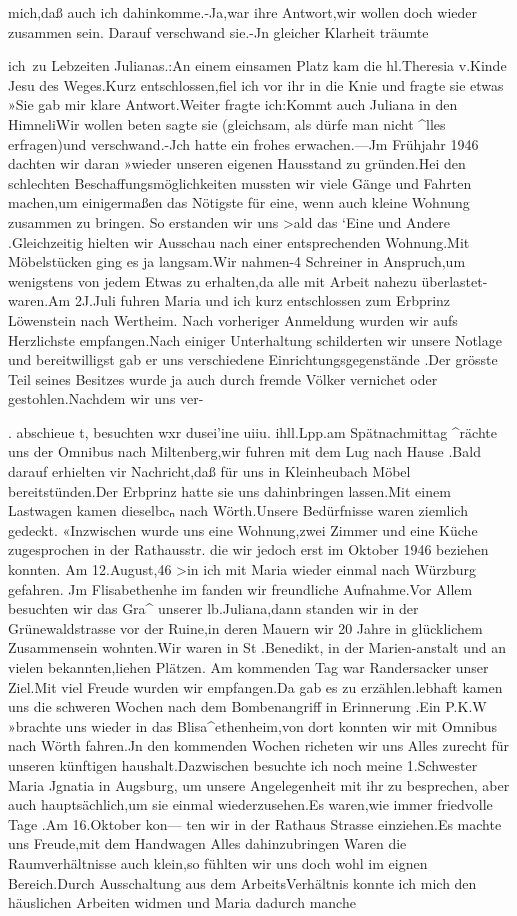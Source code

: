 \documentclass[a4paper,11pt]{article}
\begin{document}
mich,daß auch ich dahinkomme.-Ja,war ihre Antwort,wir wollen doch wieder zusammen sein. Darauf verschwand sie.-Jn gleicher Klarheit träumte

ich~zu Lebzeiten Julianas.:An einem einsamen Platz kam die hl.Theresia v.Kinde Jesu des Weges.Kurz entschlossen,fiel ich vor ihr in die Knie und fragte sie etwas »Sie gab mir klare Antwort.Weiter fragte ich:Kommt auch Juliana in den HimneliWir wollen beten sagte sie (gleichsam, als dürfe man nicht ^lles erfragen)und verschwand.-Jch hatte ein frohes erwachen.—Jm Frühjahr 1946 dachten wir daran »wieder unseren eigenen Hausstand zu gründen.Hei den schlechten Beschaffungsmöglichkeiten mussten wir viele Gänge und Fahrten machen,um einigermaßen das Nötigste für eine, wenn auch kleine Wohnung zusammen zu bringen. So erstanden wir uns >ald das ‘Eine und Andere .Gleichzeitig hielten wir Ausschau nach einer entsprechenden Wohnung.Mit Möbelstücken ging es ja langsam.Wir nahmen-4 Schreiner in Anspruch,um wenigstens von jedem Etwas zu erhalten,da alle mit Arbeit nahezu überlastet- waren.Am 2J.Juli fuhren Maria und ich kurz entschlossen zum Erbprinz Löwenstein nach Wertheim. Nach vorheriger Anmeldung wurden wir aufs Herzlichste empfangen.Nach einiger Unterhaltung schilderten wir unsere Notlage und bereitwilligst gab er uns verschiedene Einrichtungsgegenstände .Der grösste Teil seines Besitzes wurde ja auch durch fremde Völker vernichet oder gestohlen.Nachdem wir uns ver-

. abschieue t, besuchten wxr dusei'ine uiiu. ihll.Lpp.am Spätnachmittag ^rächte uns der Omnibus nach Miltenberg,wir fuhren mit dem Lug nach Hause .Bald darauf erhielten vir Nachricht,daß für uns in Kleinheubach Möbel bereitstünden.Der Erbprinz hatte sie uns dahinbringen lassen.Mit einem Lastwagen kamen dieselbcₙ nach Wörth.Unsere Bedürfnisse waren ziemlich gedeckt. «Inzwischen wurde uns eine Wohnung,zwei Zimmer und eine Küche zugesprochen in der Rathausstr. die wir jedoch erst im Oktober 1946 beziehen konnten. Am 12.August,46 >in ich mit Maria wieder einmal nach Würzburg gefahren. Jm Flisabethenhe im fanden wir freundliche Aufnahme.Vor Allem besuchten wir das Gra^ unserer lb.Juliana,dann standen wir in der Grünewaldstrasse vor der Ruine,in deren Mauern wir 20 Jahre in glücklichem Zusammensein wohnten.Wir waren in St .Benedikt, in der Marien-anstalt und an vielen bekannten,liehen Plätzen. Am kommenden Tag war Randersacker unser Ziel.Mit viel Freude wurden wir empfangen.Da gab es zu erzählen.lebhaft kamen uns die schweren Wochen nach dem Bombenangriff in Erinnerung .Ein P.K.W »brachte uns wieder in das Blisa^ethenheim,von dort konnten wir mit Omnibus nach Wörth fahren.Jn den kommenden Wochen richeten wir uns Alles zurecht für unseren künftigen haushalt.Dazwischen besuchte ich noch meine 1.Schwester Maria Jgnatia in Augsburg, um unsere Angelegenheit mit ihr zu besprechen, aber auch hauptsächlich,um sie einmal wiederzusehen.Es waren,wie immer friedvolle Tage .Am 16.Oktober kon— ten wir in der Rathaus Strasse einziehen.Es machte uns Freude,mit dem Handwagen Alles dahinzubringen Waren die Raumverhältnisse auch klein,so fühlten wir uns doch wohl im eignen Bereich.Durch Ausschaltung aus dem ArbeitsVerhältnis konnte ich mich den häuslichen Arbeiten widmen und Maria dadurch manche
\end{document}

